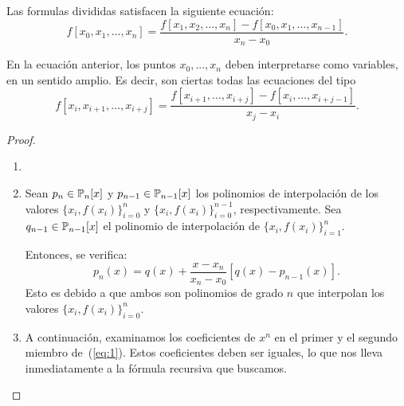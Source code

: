    
% 
 
\begin{lemma}
  \label{lem:1}
  Las formulas divididas satisfacen la siguiente ecuación:
  \begin{equation*}
    f[x_0,x_1,\dots,x_n]=
    \frac{f[x_1,x_2,\dots,x_n]-f[x_0,x_1,\dots,x_{n-1}]}{x_n - x_0}.
  \end{equation*}
\end{lemma}
En la ecuación anterior, los puntos $x_0,...,x_n$ deben interpretarse
como variables, en un sentido amplio. Es decir, son ciertas todas las
ecuaciones del tipo
\begin{equation*}
  f[x_i,x_{i+1},\dots,x_{i+j}]=
  \frac{f[x_{i+1},\dots,x_{i+j}]-f[x_i,\dots,x_{i+j-1}]}{x_j - x_i}.
\end{equation*}

\begin{proof}~
  \begin{enumerate}
  \item 
  \item Sean $p_n\in\operatorname{{\mathbb P}}_n[x]$ y $p_{n-1}\in \operatorname{{\mathbb P}}_{n-1}[x]$ los 
    polinomios de interpolación de los
    valores $\{x_i,f(x_i)\}_{i=0}^n$ y $\{x_i,f(x_i)\}_{i=0}^{n-1}$,
    respectivamente. Sea $q_{n-1}\in\operatorname{{\mathbb P}}_{n-1}[x]$ el polinomio de
    interpolación de $\{x_i,f(x_i)\}_{i=1}^{n}$.

    Entonces, se verifica:
    \begin{equation}
    p_n(x)=q(x)+\frac{x-x_n}{x_n-x_0}\left[q(x)-p_{n-1}(x)\right].\label{eq:1}
  \end{equation}
    Esto es debido a que ambos son polinomios de grado $n$ que
    interpolan los valores $\{x_i,f(x_i)\}_{i=0}^n$.
  \item A continuación, examinamos los coeficientes de $x^n$ en el
    primer y el segundo miembro de~(\ref{eq:1}). Estos coeficientes
    deben ser iguales, lo que nos lleva inmediatamente a la fórmula
    recursiva que buscamos.
  \end{enumerate}
\end{proof}

